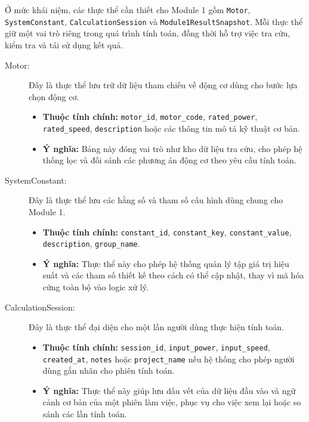 \documentclass[a4paper]{article}
\begin{document}
Ở mức khái niệm, các thực thể cần thiết cho Module 1 gồm \texttt{Motor}, \texttt{SystemConstant}, \texttt{CalculationSession} và \texttt{Module1ResultSnapshot}. Mỗi thực thể giữ một vai trò riêng trong quá trình tính toán, đồng thời hỗ trợ việc tra cứu, kiểm tra và tái sử dụng kết quả.

\begin{description}
    \item[Motor:]
    Đây là thực thể lưu trữ dữ liệu tham chiếu về động cơ dùng cho bước lựa chọn động cơ.
    \begin{itemize}
        \item \textbf{Thuộc tính chính:} \texttt{motor\_id}, \texttt{motor\_code}, \texttt{rated\_power}, \texttt{rated\_speed}, \texttt{description} hoặc các thông tin mô tả kỹ thuật cơ bản.
        \item \textbf{Ý nghĩa:} Bảng này đóng vai trò như kho dữ liệu tra cứu, cho phép hệ thống lọc và đối sánh các phương án động cơ theo yêu cầu tính toán.
    \end{itemize}

    \item[SystemConstant:]
    Đây là thực thể lưu các hằng số và tham số cấu hình dùng chung cho Module 1.
    \begin{itemize}
        \item \textbf{Thuộc tính chính:} \texttt{constant\_id}, \texttt{constant\_key}, \texttt{constant\_value}, \texttt{description}, \texttt{group\_name}.
        \item \textbf{Ý nghĩa:} Thực thể này cho phép hệ thống quản lý tập giá trị hiệu suất và các tham số thiết kế theo cách có thể cập nhật, thay vì mã hóa cứng toàn bộ vào logic xử lý.
    \end{itemize}

    \item[CalculationSession:]
    Đây là thực thể đại diện cho một lần người dùng thực hiện tính toán.
    \begin{itemize}
        \item \textbf{Thuộc tính chính:} \texttt{session\_id}, \texttt{input\_power}, \texttt{input\_speed}, \texttt{created\_at}, \texttt{notes} hoặc \texttt{project\_name} nếu hệ thống cho phép người dùng gắn nhãn cho phiên tính toán.
        \item \textbf{Ý nghĩa:} Thực thể này giúp lưu dấu vết của dữ liệu đầu vào và ngữ cảnh cơ bản của một phiên làm việc, phục vụ cho việc xem lại hoặc so sánh các lần tính toán.
    \end{itemize}


\end{description}
\end{document}
